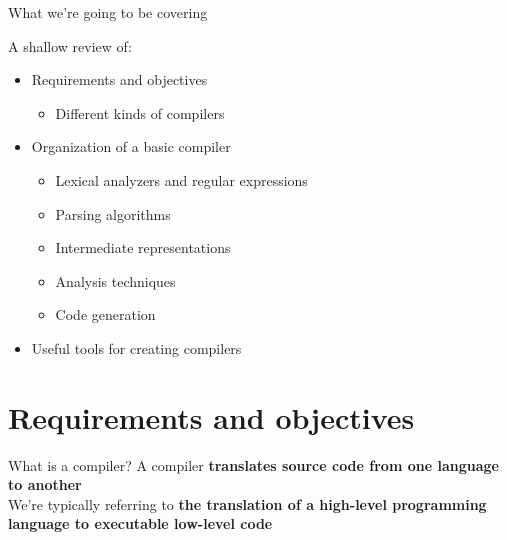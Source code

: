 \documentclass[../index.tex]{subfiles}
\begin{document}

\renewcommand{\sectiontitle}{Before we begin}
\renewcommand{\currenttitle}{What we're going to be covering}
\begin{frame}{\currenttitle}
  
  A shallow review of:

  \begin{itemize}
    \item Requirements and objectives
      \begin{itemize}
        \item Different kinds of compilers
      \end{itemize}
    \item Organization of a basic compiler
      \begin{itemize}
        \item Lexical analyzers and regular expressions
        \item Parsing algorithms
        \item Intermediate representations
        \item Analysis techniques
        \item Code generation
      \end{itemize}
    \item Useful tools for creating compilers
  \end{itemize}
\end{frame}

\renewcommand{\sectiontitle}{Requirements and objectives}
\section{\sectiontitle}

\renewcommand{\currenttitle}{What is a compiler?}
\begin{frame}[fragile]{\currenttitle}
  A compiler \textbf{translates source code from one language to another} \\[2em]

  We're typically referring to \textbf{the translation of a high-level
  programming language to executable low-level code}
\end{frame}
\end{document}
